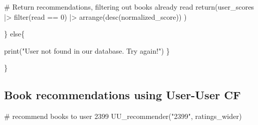 \documentclass[
]{report}
\newenvironment{Shaded}{\begin{snugshade}}{\end{snugshade}}
\newcommand{\CommentTok}[1]{\textcolor[rgb]{0.37,0.37,0.37}{#1}}
\newcommand{\ControlFlowTok}[1]{\textcolor[rgb]{0.00,0.23,0.31}{#1}}
\newcommand{\DecValTok}[1]{\textcolor[rgb]{0.68,0.00,0.00}{#1}}
\newcommand{\FunctionTok}[1]{\textcolor[rgb]{0.28,0.35,0.67}{#1}}
\newcommand{\NormalTok}[1]{\textcolor[rgb]{0.00,0.23,0.31}{#1}}
\newcommand{\SpecialCharTok}[1]{\textcolor[rgb]{0.37,0.37,0.37}{#1}}
\newcommand{\StringTok}[1]{\textcolor[rgb]{0.13,0.47,0.30}{#1}}
\begin{document}
\begin{Shaded}
\begin{Highlighting}[]
                    
    
    \CommentTok{\# Return recommendations, filtering out books already read}
    \FunctionTok{return}\NormalTok{(user\_scores }\SpecialCharTok{|\textgreater{}}
               \FunctionTok{filter}\NormalTok{(read }\SpecialCharTok{==} \DecValTok{0}\NormalTok{) }\SpecialCharTok{|\textgreater{}}
               \FunctionTok{arrange}\NormalTok{(}\FunctionTok{desc}\NormalTok{(normalized\_score))}
\NormalTok{    )}
    
\NormalTok{  \} }\ControlFlowTok{else}\NormalTok{\{}
    
    \FunctionTok{print}\NormalTok{(}\StringTok{"User not found in our database. Try again!"}\NormalTok{)}
\NormalTok{  \}}
  
\NormalTok{\}}
\end{Highlighting}
\end{Shaded}

\subsection{Book recommendations using User-User
CF}\label{book-recommendations-using-user-user-cf}

\begin{Shaded}
\begin{Highlighting}[]
\CommentTok{\# recommend books to user 2399}
\FunctionTok{UU\_recommender}\NormalTok{(}\StringTok{"2399"}\NormalTok{, ratings\_wider)}
\end{Highlighting}
\end{Shaded}
\end{document}

